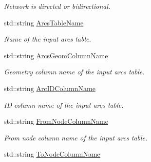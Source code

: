 \begin{DoxyCompactItemize}
\begin{DoxyCompactList}\small\item\em Network is directed or bidirectional. \end{DoxyCompactList}\item 
std\+::string \hyperlink{structnetxpert_1_1cnfg_1_1Config_a123bb51f96e9136786cda1256b6ba68b}{Arcs\+Table\+Name}\hypertarget{structnetxpert_1_1cnfg_1_1Config_a123bb51f96e9136786cda1256b6ba68b}{}\label{structnetxpert_1_1cnfg_1_1Config_a123bb51f96e9136786cda1256b6ba68b}

\begin{DoxyCompactList}\small\item\em Name of the input arcs table. \end{DoxyCompactList}\item 
std\+::string \hyperlink{structnetxpert_1_1cnfg_1_1Config_aad2f1620e6f0724d682e8b789a3e5f84}{Arcs\+Geom\+Column\+Name}\hypertarget{structnetxpert_1_1cnfg_1_1Config_aad2f1620e6f0724d682e8b789a3e5f84}{}\label{structnetxpert_1_1cnfg_1_1Config_aad2f1620e6f0724d682e8b789a3e5f84}

\begin{DoxyCompactList}\small\item\em Geometry column name of the input arcs table. \end{DoxyCompactList}\item 
std\+::string \hyperlink{structnetxpert_1_1cnfg_1_1Config_a9c2df9c1f47014aef22ebd85e227907c}{Arc\+I\+D\+Column\+Name}\hypertarget{structnetxpert_1_1cnfg_1_1Config_a9c2df9c1f47014aef22ebd85e227907c}{}\label{structnetxpert_1_1cnfg_1_1Config_a9c2df9c1f47014aef22ebd85e227907c}

\begin{DoxyCompactList}\small\item\em ID column name of the input arcs table. \end{DoxyCompactList}\item 
std\+::string \hyperlink{structnetxpert_1_1cnfg_1_1Config_a7751fdb84c5fb76f8af07dba25768357}{From\+Node\+Column\+Name}\hypertarget{structnetxpert_1_1cnfg_1_1Config_a7751fdb84c5fb76f8af07dba25768357}{}\label{structnetxpert_1_1cnfg_1_1Config_a7751fdb84c5fb76f8af07dba25768357}

\begin{DoxyCompactList}\small\item\em From node column name of the input arcs table. \end{DoxyCompactList}\item 
std\+::string \hyperlink{structnetxpert_1_1cnfg_1_1Config_af5ab8e729eafee4eb059a251343d68f8}{To\+Node\+Column\+Name}\hypertarget{structnetxpert_1_1cnfg_1_1Config_af5ab8e729eafee4eb059a251343d68f8}{}\label{structnetxpert_1_1cnfg_1_1Config_af5ab8e729eafee4eb059a251343d68f8}


\end{DoxyCompactItemize}
